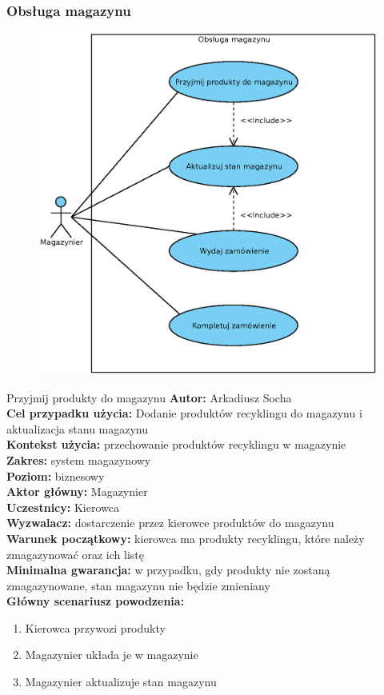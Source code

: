 \subsubsection{Obsługa magazynu}

	\begin{figure}[H]
		\centering
		\includegraphics[width=.8\textwidth]{img/UC/magazyn.eps}
	\end{figure}

	\begin{usecase}{Przyjmij produkty do magazynu}
		\textbf{Autor:} Arkadiusz Socha\\
		\textbf{Cel przypadku użycia:} Dodanie produktów recyklingu do magazynu i aktualizacja stanu magazynu \\
		\textbf{Kontekst użycia:} przechowanie produktów recyklingu w magazynie\\
		\textbf{Zakres:} system magazynowy \\
		\textbf{Poziom:} biznesowy \\
		\textbf{Aktor główny:} Magazynier \\
		\textbf{Uczestnicy:} Kierowca \\
		\textbf{Wyzwalacz:} dostarczenie przez kierowce produktów do magazynu \\
		\textbf{Warunek początkowy:} kierowca ma produkty recyklingu, które należy zmagazynować oraz ich listę \\
		\textbf{Minimalna gwarancja:} w przypadku, gdy produkty nie zostaną zmagazynowane, stan magazynu nie będzie zmieniany \\
		\textbf{Główny scenariusz powodzenia:} \\
			\begin{enumerate}
				\item Kierowca przywozi produkty
				\item Magazynier układa je w magazynie
				\item Magazynier aktualizuje stan magazynu
			\end{enumerate}
	\end{usecase}

